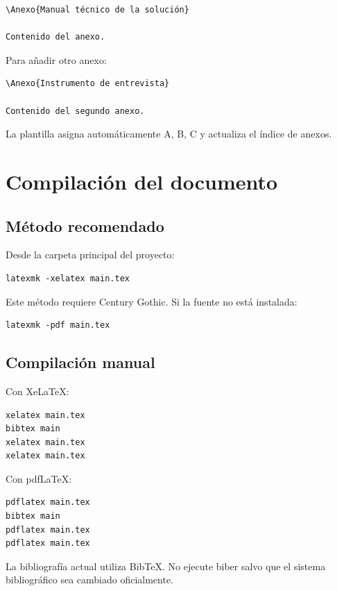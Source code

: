 \documentclass[12pt,a4paper,oneside]{report}
\begin{document}
\begin{lstlisting}
\Anexo{Manual técnico de la solución}

Contenido del anexo.
\end{lstlisting}

Para añadir otro anexo:

\begin{lstlisting}
\Anexo{Instrumento de entrevista}

Contenido del segundo anexo.
\end{lstlisting}

La plantilla asigna automáticamente A, B, C y actualiza el índice de anexos.

\chapter{Compilación del documento}

\section{Método recomendado}

Desde la carpeta principal del proyecto:

\begin{lstlisting}
latexmk -xelatex main.tex
\end{lstlisting}

Este método requiere Century Gothic. Si la fuente no está instalada:

\begin{lstlisting}
latexmk -pdf main.tex
\end{lstlisting}

\section{Compilación manual}

Con XeLaTeX:

\begin{lstlisting}
xelatex main.tex
bibtex main
xelatex main.tex
xelatex main.tex
\end{lstlisting}

Con pdfLaTeX:

\begin{lstlisting}
pdflatex main.tex
bibtex main
pdflatex main.tex
pdflatex main.tex
\end{lstlisting}

La bibliografía actual utiliza BibTeX. No ejecute biber salvo que el sistema bibliográfico sea cambiado oficialmente.
\end{document}

